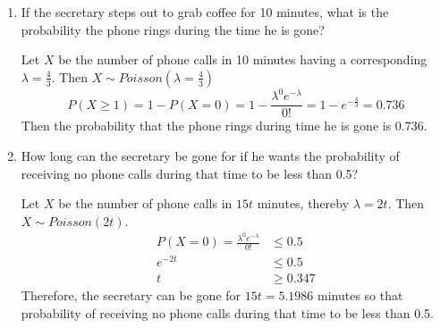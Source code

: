 \documentclass[11pt]{article}
\begin{document}
\begin{enumerate}
  \item If the secretary steps out to grab coffee for 10 minutes, what is the probability the phone rings during the time he is gone?
  \begin{solution}
    $ $\\
    Let $X$ be the number of phone calls in 10 minutes having a corresponding $\lambda = \frac{4}{3}$. Then $X\sim Poisson(\lambda = \frac{4}{3})$
    \[
      P(X\geq 1) = 1- P(X=0) = 1-\frac{\lambda^0e^{-\lambda}}{0!} = 1- e^{-\frac{4}{3}} = 0.736
    \]
    Then the probability that the phone rings during time he is gone is 0.736.
  \end{solution}
  \item How long can the secretary be gone for if he wants the probability of receiving no phone calls during that time to be less than 0.5?
  \begin{solution}
    $ $\\
    Let $X$ be the number of phone calls in $15t$ minutes, thereby $\lambda = 2t$. Then $X\sim Poisson(2t)$.
    \begin{align*}
      P(X=0) =\frac{\lambda^0e^{-\lambda}}{0!} &\leq 0.5\\
      e^{-2t} &\leq 0.5 \\
      t &\geq  0.347
    \end{align*}
    Therefore, the secretary can be gone for $15t = 5.1986$ minutes so that probability of receiving no phone calls during that time to be less than 0.5.
  \end{solution}
\end{enumerate}
\end{document}
